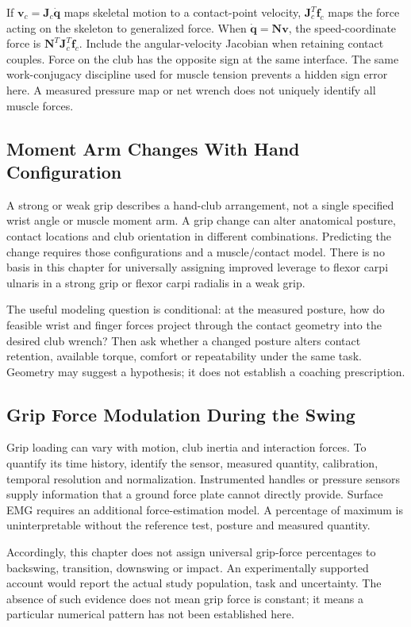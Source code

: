 If $\bm v_c=\bm J_c\dot{\bm q}$ maps skeletal motion to a contact-point velocity, $\bm J_c^T\bm f_c$ maps the force acting on the skeleton to generalized force. When $\dot{\bm q}=\bm N\bm v$, the speed-coordinate force is $\bm N^T\bm J_c^T\bm f_c$. Include the angular-velocity Jacobian when retaining contact couples. Force on the club has the opposite sign at the same interface. The same work-conjugacy discipline used for muscle tension prevents a hidden sign error here. A measured pressure map or net wrench does not uniquely identify all muscle forces.

\subsection{Moment Arm Changes With Hand Configuration}

A strong or weak grip describes a hand-club arrangement, not a single specified wrist angle or muscle moment arm. A grip change can alter anatomical posture, contact locations and club orientation in different combinations. Predicting the change requires those configurations and a muscle/contact model. There is no basis in this chapter for universally assigning improved leverage to flexor carpi ulnaris in a strong grip or flexor carpi radialis in a weak grip.

The useful modeling question is conditional: at the measured posture, how do feasible wrist and finger forces project through the contact geometry into the desired club wrench? Then ask whether a changed posture alters contact retention, available torque, comfort or repeatability under the same task. Geometry may suggest a hypothesis; it does not establish a coaching prescription.

\subsection{Grip Force Modulation During the Swing}

Grip loading can vary with motion, club inertia and interaction forces. To quantify its time history, identify the sensor, measured quantity, calibration, temporal resolution and normalization. Instrumented handles or pressure sensors supply information that a ground force plate cannot directly provide. Surface EMG requires an additional force-estimation model. A percentage of maximum is uninterpretable without the reference test, posture and measured quantity.

Accordingly, this chapter does not assign universal grip-force percentages to backswing, transition, downswing or impact. An experimentally supported account would report the actual study population, task and uncertainty. The absence of such evidence does not mean grip force is constant; it means a particular numerical pattern has not been established here.

